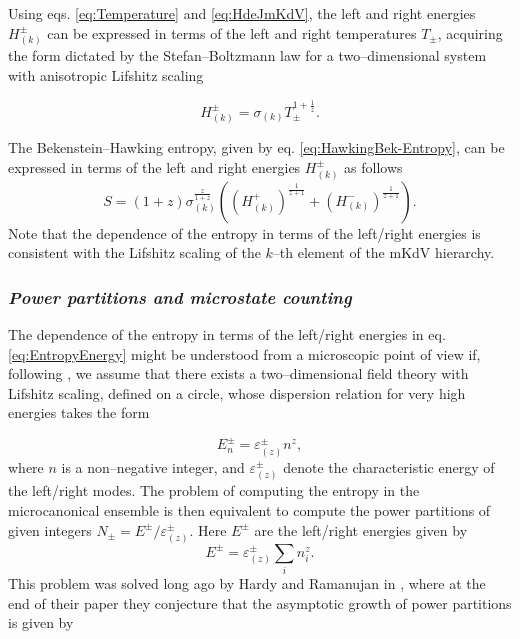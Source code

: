 \documentclass[letterpaper,11pt,oneside]{book}
\begin{document}
Using eqs. \eqref{eq:Temperature} and \eqref{eq:HdeJmKdV}, the left
and right energies $H_{\left(k\right)}^{\pm}$ can be expressed in
terms of the left and right temperatures $T_{\pm}$, acquiring the
form dictated by the Stefan--Boltzmann law for a two--dimensional
system with anisotropic Lifshitz scaling \cite{Gonzalez:2011nz}

\[
H_{\left(k\right)}^{\pm}=\sigma_{\left(k\right)}T_{\pm}^{1+\frac{1}{z}}.
\]

The Bekenstein--Hawking entropy, given by eq. \eqref{eq:HawkingBek-Entropy},
can be expressed in terms of the left and right energies $H_{\left(k\right)}^{\pm}$
as follows
\begin{equation}
	S=\left(1+z\right)\sigma_{\left(k\right)}^{\frac{z}{1+z}}\left(\left(H_{\left(k\right)}^{+}\right)^{\frac{1}{z+1}}+\left(H_{\left(k\right)}^{-}\right)^{\frac{1}{z+1}}\right).\label{eq:EntropyEnergy}
\end{equation}
Note that the dependence of the entropy in terms of the left/right
energies is consistent with the Lifshitz scaling of the $k$--th
element of the mKdV hierarchy.

\subsubsection*{\emph{Power partitions and microstate counting}}

The dependence of the entropy in terms of the left/right energies
in eq. \eqref{eq:EntropyEnergy} might be understood from a microscopic
point of view if, following \cite{Melnikov:2018fhb}, we assume that
there exists a two--dimensional field theory with Lifshitz scaling,
defined on a circle, whose dispersion relation for very high energies
takes the form

\begin{equation}
	E_{n}^{\pm}=\varepsilon_{\left(z\right)}^{\pm}n^{z},\label{eq:Dispersion}
\end{equation}
where $n$ is a non--negative integer, and $\varepsilon_{\left(z\right)}^{\pm}$
denote the characteristic energy of the left/right modes. The problem
of computing the entropy in the microcanonical ensemble is then equivalent
to compute the power partitions of given integers $N_{\pm}=E^{\pm}/\varepsilon_{\left(z\right)}^{\pm}$.
Here $E^{\pm}$ are the left/right energies given by 
\[
E^{\pm}=\varepsilon_{\left(z\right)}^{\pm}\sum_{i}n_{i}^{z}.
\]
This problem was solved long ago by Hardy and Ramanujan in \cite{hardy1918},
where at the end of their paper they conjecture that the asymptotic
growth of power partitions is given by
\end{document}
